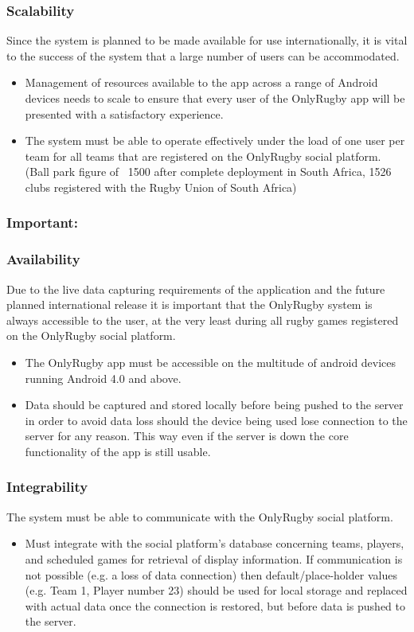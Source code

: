 \documentclass[hidelinks,a4paper,12pt]{article}
\begin{document}
	\subsubsection*{Scalability}
	Since the system is planned to be made available for use internationally, it is vital to the success of the system that a large number of users can be accommodated.
	\begin{itemize}
		\item Management of resources available to the app across a range of Android devices needs to scale to ensure that every user of the OnlyRugby app will be presented with a satisfactory experience.
		\item The system must be able to operate effectively under the load of one user per team for all teams that are registered on the OnlyRugby social platform. (Ball park figure of ~1500 after complete deployment in South Africa, 1526 clubs registered with the Rugby Union of South Africa)
	\end{itemize}

	\subsubsection{Important:}

	\subsubsection*{Availability}
	Due to the live data capturing requirements of the application and the future planned international release it is important that the OnlyRugby system is always accessible to the user, at the very least during all rugby games registered on the OnlyRugby social platform.
	\begin{itemize}
		\item The OnlyRugby app must be accessible on the multitude of android devices running Android 4.0 and above.
		\item Data should be captured and stored locally before being pushed to the server in order to avoid data loss should the device being used lose connection to the server for any reason. This way even if the server is down the core functionality of the app is still usable.
	\end{itemize}

	\subsubsection*{Integrability}
	The system must be able to communicate with the OnlyRugby social platform.
	\begin{itemize}
		\item Must integrate with the social platform's database concerning teams, players, and scheduled games for retrieval of display information. If communication is not possible (e.g. a loss of data connection) then default/place-holder values (e.g. Team 1, Player number 23) should be used for local storage and replaced with actual data once the connection is restored, but before data is pushed to the server.
	\end{itemize}
\end{document}
